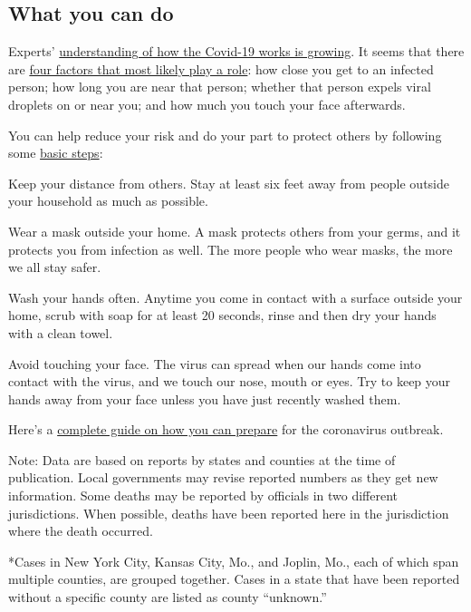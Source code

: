 \hypertarget{what-you-can-do}{%
\subsection{What you can do}\label{what-you-can-do}}

Experts'
\href{https://www.nytimes3xbfgragh.onion/2020/06/02/health/coronavirus-profile-covid.html}{understanding
of how the Covid-19 works is growing}. It seems that there are
\href{https://www.nytimes3xbfgragh.onion/article/coronavirus-how-it-spreads.html}{four
factors that most likely play a role}: how close you get to an infected
person; how long you are near that person; whether that person expels
viral droplets on or near you; and how much you touch your face
afterwards.

You can help reduce your risk and do your part to protect others by
following some
\href{https://www.nytimes3xbfgragh.onion/article/prepare-for-coronavirus.html}{basic
steps}:

Keep your distance from others. Stay at least six feet away from people
outside your household as much as possible.

Wear a mask outside your home. A mask protects others from your germs,
and it protects you from infection as well. The more people who wear
masks, the more we all stay safer.

Wash your hands often. Anytime you come in contact with a surface
outside your home, scrub with soap for at least 20 seconds, rinse and
then dry your hands with a clean towel.

Avoid touching your face. The virus can spread when our hands come into
contact with the virus, and we touch our nose, mouth or eyes. Try to
keep your hands away from your face unless you have just recently washed
them.

Here's a
\href{https://www.nytimes3xbfgragh.onion/interactive/2020/world/coronavirus-tips-advice.html}{complete
guide on how you can prepare} for the coronavirus outbreak.

Note: Data are based on reports by states and counties at the time of
publication. Local governments may revise reported numbers as they get
new information. Some deaths may be reported by officials in two
different jurisdictions. When possible, deaths have been reported here
in the jurisdiction where the death occurred.

*Cases in New York City, Kansas City, Mo., and Joplin, Mo., each of
which span multiple counties, are grouped together. Cases in a state
that have been reported without a specific county are listed as county
``unknown.''

